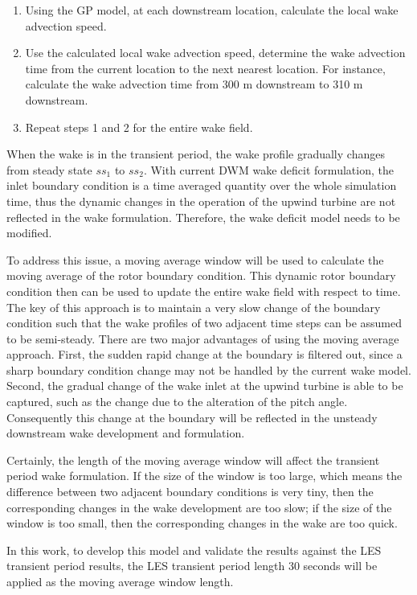 \documentclass{umthesis}
\begin{document}
\begin{enumerate}
  \item Using the GP model, at each downstream location, calculate the local wake advection speed.
  \item Use the calculated local wake advection speed, determine the wake advection time from the current location to the next nearest location. For instance, calculate the wake advection time from 300 m downstream to 310 m downstream.
  \item Repeat steps 1 and 2 for the entire wake field.
\end{enumerate}

When the wake is in the transient period, the wake profile gradually changes from steady state $ss_1$ to $ss_2$. With current DWM wake deficit formulation, the inlet boundary condition is a time averaged quantity over the whole simulation time, thus the dynamic changes in the operation of the upwind turbine are not reflected in the wake formulation. Therefore, the wake deficit model needs to be modified.

To address this issue, a moving average window will be used to calculate the moving average of the rotor boundary condition. This dynamic rotor boundary condition then can be used to update the entire wake field with respect to time. The key of this approach is to maintain a very slow change of the boundary condition such that the wake profiles of two adjacent time steps can be assumed to be semi-steady. There are two major advantages of using the moving average approach. First, the sudden rapid change at the boundary is filtered out, since a sharp boundary condition change may not be handled by the current wake model. Second, the gradual change of the wake inlet at the upwind turbine is able to be captured, such as the change due to the alteration of the pitch angle. Consequently this change at the boundary will be reflected in the unsteady downstream wake development and formulation. 

Certainly, the length of the moving average window will affect the transient period wake formulation. If the size of the window is too large, which means the difference between two adjacent boundary conditions is very tiny, then the corresponding changes in the wake development are too slow; if the size of the window is too small, then the corresponding changes in the wake are too quick.

In this work, to develop this model and validate the results against the LES transient period results, the LES transient period length 30 seconds will be applied as the moving average window length. 
\end{document}
